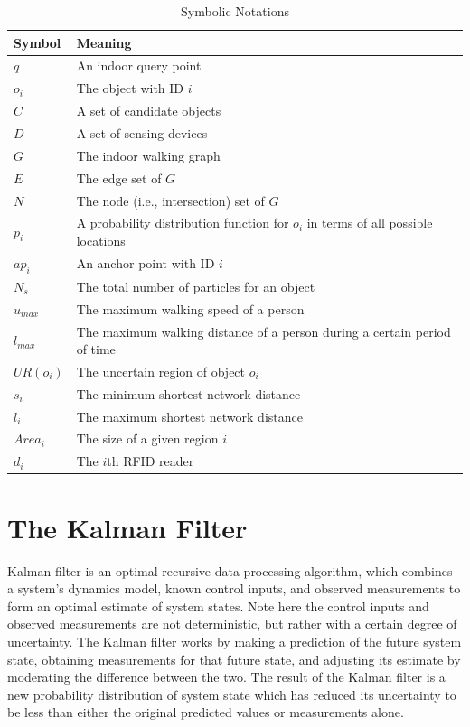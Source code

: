 \documentclass[12pt]{report}
\begin{document}
\begin{table}[htbp]
\caption{\label{tab:notation}
Symbolic Notations}
\centering
\begin{tabular}{ll}
\hline
Symbol & Meaning\\
\hline
\(q\) & An indoor query point\\
\(o_i\) & The object with ID \(i\)\\
\(C\) & A set of candidate objects\\
\(D\) & A set of sensing devices\\
\(G\) & The indoor walking graph\\
\(E\) & The edge set of \(G\)\\
\(N\) & The node (i.e., intersection) set of \(G\)\\
\(p_i\) & A probability distribution function for \(o_i\) in terms of all possible locations\\
\(ap_i\) & An anchor point with ID \(i\)\\
\(N_s\) & The total number of particles for an object\\
\(u_{max}\) & The maximum walking speed of a person\\
\(l_{max}\) & The maximum walking distance of a person during a certain period of time\\
\(UR(o_i)\) & The uncertain region of object \(o_i\)\\
\(s_i\) & The minimum shortest network distance\\
\(l_i\) & The maximum shortest network distance\\
\(Area_i\) & The size of a given region \(i\)\\
\(d_i\) & The \(i\)th RFID reader\\
\hline
\end{tabular}
\end{table}

\chapter{The Kalman Filter}
\label{sec:kalman-filter}
Kalman filter is an optimal recursive data processing algorithm,
which combines a system's dynamics model, known control inputs, and
observed measurements to form an optimal estimate of system states.
Note here the control inputs and observed measurements are not
deterministic, but rather with a certain degree of uncertainty.
The Kalman filter works by making a prediction of the future system
state, obtaining measurements for that future state, and adjusting
its estimate by moderating the difference between the two.  The
result of the Kalman filter is a new probability distribution of
system state which has reduced its uncertainty to be less than
either the original predicted values or measurements alone.
\end{document}
